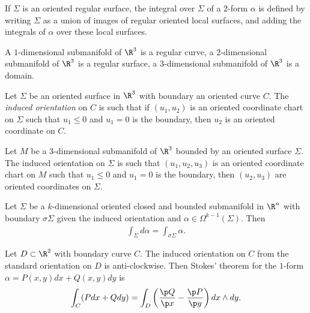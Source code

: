 \documentclass{article}
\begin{document}
\begin{definition}
	If $\Sigma$ is an oriented regular surface, the integral over $\Sigma$ of a $2$-form $\alpha$
	is defined by writing $\Sigma$ as a union of images of regular oriented local surfaces, and
	adding the integrals of $\alpha$ over these local surfaces.
\end{definition}

\begin{definition}
	A $1$-dimensional submanifold of $\R^3$ is a regular curve, a $2$-dimensional submanifold of
	$\R^3$ is a regular surface, a $3$-dimensional submanifold of $\R^3$ is a domain.
\end{definition}

\begin{definition}
	Let $\Sigma$ be an oriented surface in $\R^3$ with boundary an oriented curve $C$.
	The \emph{induced orientation} on $C$ is such that if $(u_1,u_2)$ is an oriented coordinate
	chart on $\Sigma$ such that $u_1\leq 0$ and $u_1=0$ is the boundary, then $u_2$ is an
	oriented coordinate on $C$.

	Let $M$ be a $3$-dimensional submanifold of $\R^3$ bounded by
	an oriented surface $\Sigma$. The induced orientation on $\Sigma$ is such that $(u_1,u_2,u_3)$
	is an oriented coordinate chart on $M$ such that $u_1\leq 0$ and $u_1=0$ is the boundary,
	then $(u_2,u_3)$ are oriented coordinates on $\Sigma$.
\end{definition}

\begin{theorem}[Stokes]
	Let $\Sigma$ be a $k$-dimensional oriented closed and bounded submanifold in $\R^n$ with
	boundary $\sigma\Sigma$ given the induced orientation and $\alpha\in\Omega^{k-1}(\Sigma)$.
	Then
	\begin{align*}
		\int_\Sigma d\alpha = \int_{\sigma\Sigma}\alpha.
	\end{align*}
\end{theorem}

\begin{corollary}[Green]
	Let $D\subset\R^2$ with boundary curve $C$. The induced orientation on $C$ from
	the standard orientation on $D$ is anti-clockwise. Then Stokes' theorem for the $1$-form
	$\alpha=P(x,y)dx + Q(x,y)dy$ is
	\begin{align*}
		\int_C(Pdx + Qdy) = \int_D\left(\frac{\p Q}{\p x}-\frac{\p P}{\p y}\right)dx\wedge dy.
	\end{align*}
\end{corollary}
\end{document}
